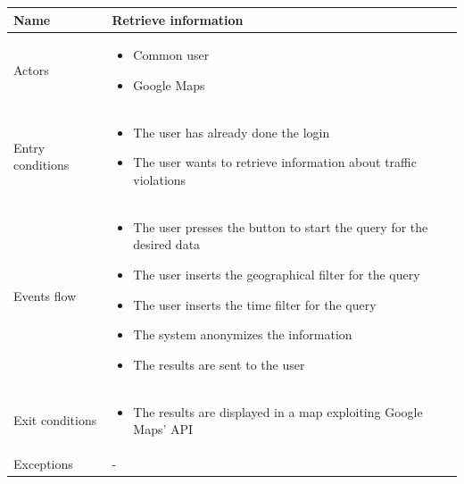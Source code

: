 \documentclass[a4paper]{article}
\begin{document}
\begin{table}[H]
\centering
\begin{tabularx}{\textwidth}{|l|X|}
\hline
Name & Retrieve information\tabularnewline
\hline
Actors &
\begin{itemize}[nosep,leftmargin=*]
\item Common user
\item Google Maps
\end{itemize}
\tabularnewline
\hline
Entry conditions &
\begin{itemize}[nosep,leftmargin=*]
\item The user has already done the login
\item The user wants to retrieve information about traffic violations
\end{itemize}
\tabularnewline
\hline
Events flow &
\begin{itemize}[nosep,leftmargin=*]
\item The user presses the button to start the query for the desired data
\item The user inserts the geographical filter for the query
\item The user inserts the time filter for the query
\item The system anonymizes the information
\item The results are sent to the user
\end{itemize}
\tabularnewline
\hline
Exit conditions &
\begin{itemize}[nosep,leftmargin=*]
\item The results are displayed in a map exploiting Google Maps' API
\end{itemize}
\tabularnewline
\hline
Exceptions & -\tabularnewline
\hline
\end{tabularx}
\end{table}
\end{document}
